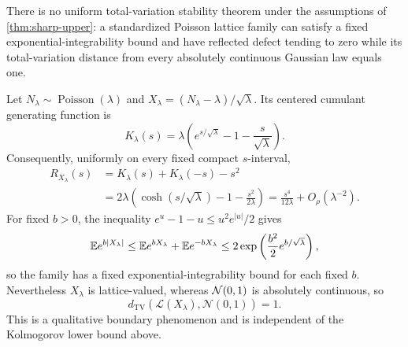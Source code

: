 \begin{proposition}\label{prop:tv}
There is no uniform total-variation stability theorem under the assumptions of \cref{thm:sharp-upper}: a standardized Poisson lattice family can satisfy a fixed exponential-integrability bound and have reflected defect tending to zero while its total-variation distance from every absolutely continuous Gaussian law equals one.
\end{proposition}

Let $N_\lambda\sim\operatorname{Poisson}(\lambda)$ and $X_\lambda=(N_\lambda-\lambda)/\sqrt\lambda$. Its centered cumulant generating function is
\[
K_\lambda(s)=\lambda\left(e^{s/\sqrt\lambda}-1-\frac{s}{\sqrt\lambda}\right).
\]
Consequently, uniformly on every fixed compact $s$-interval,
\begin{align*}
R_{X_\lambda}(s)
&=K_\lambda(s)+K_\lambda(-s)-s^2\\
&=2\lambda\left(\cosh(s/\sqrt\lambda)-1-\frac{s^2}{2\lambda}\right)
 =\frac{s^4}{12\lambda}+O_\rho(\lambda^{-2}).
\end{align*}
For fixed $b>0$, the inequality $e^u-1-u\le u^2e^{|u|}/2$ gives
\[
\mathbb E e^{b|X_\lambda|}
\le \mathbb E e^{bX_\lambda}+\mathbb E e^{-bX_\lambda}
\le 2\exp\left(\frac{b^2}{2}e^{b/\sqrt\lambda}\right),
\]
so the family has a fixed exponential-integrability bound for each fixed $b$. Nevertheless $X_\lambda$ is lattice-valued, whereas $\mathcal N(0,1)$ is absolutely continuous, so
\[
d_{\mathrm{TV}}(\mathcal L(X_\lambda),\mathcal N(0,1))=1.
\]
This is a qualitative boundary phenomenon and is independent of the Kolmogorov lower bound above.
